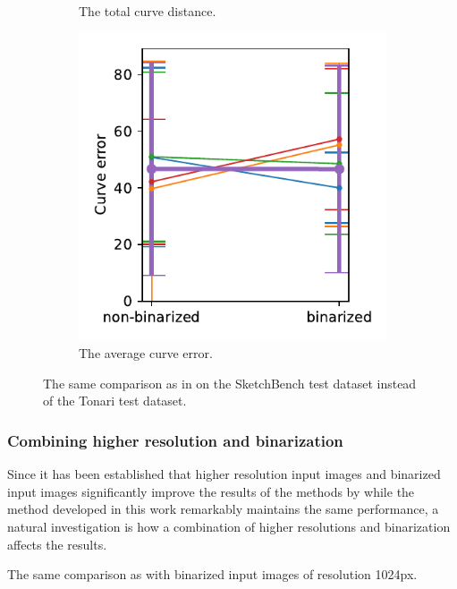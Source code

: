 \begin{figure}[h]
\begin{subfigure}{.3\textwidth}
    \caption{The total curve distance.}
\end{subfigure}
    \begin{subfigure}{.3\textwidth}
    \centering
    \includegraphics[width=\textwidth]{graphics/eval/curve error_binarization_sketchbench.pdf}
    \caption{The average curve error.}
\end{subfigure}
    \caption{The same comparison as in  on the SketchBench test dataset instead of the Tonari test dataset.}
    \label{fig:binarization_comparison.sketchbench}
\end{figure}

\clearpage
\subsubsection{Combining higher resolution and binarization}

Since it has been established that higher resolution input images and binarized input images significantly improve the results of the methods by \citet{Puhachov2021KeypointPolyvector,autotrace} while the method developed in this work remarkably maintains the same performance, a natural investigation is how a combination of higher resolutions and binarization affects the results.

\begin{table}[h]
    \centering
    
    \caption{The same comparison as  with binarized input images of resolution 1024px.}
    \label{tab:tonari-True-1024-1.024}
\end{table}

